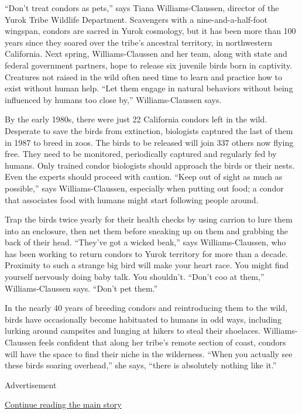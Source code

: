 ``Don't treat condors as pets,'' says Tiana Williams-Claussen, director
of the Yurok Tribe Wildlife Department. Scavengers with a
nine-and-a-half-foot wingspan, condors are sacred in Yurok cosmology,
but it has been more than 100 years since they soared over the tribe's
ancestral territory, in northwestern California. Next spring,
Williams-Claussen and her team, along with state and federal government
partners, hope to release six juvenile birds born in captivity.
Creatures not raised in the wild often need time to learn and practice
how to exist without human help. ``Let them engage in natural behaviors
without being influenced by humans too close by,'' Williams-Claussen
says.

By the early 1980s, there were just 22 California condors left in the
wild. Desperate to save the birds from extinction, biologists captured
the last of them in 1987 to breed in zoos. The birds to be released will
join 337 others now flying free. They need to be monitored, periodically
captured and regularly fed by humans. Only trained condor biologists
should approach the birds or their nests. Even the experts should
proceed with caution. ``Keep out of sight as much as possible,'' says
Williams-Claussen, especially when putting out food; a condor that
associates food with humans might start following people around.

Trap the birds twice yearly for their health checks by using carrion to
lure them into an enclosure, then net them before sneaking up on them
and grabbing the back of their head. ``They've got a wicked beak,'' says
Williams-Claussen, who has been working to return condors to Yurok
territory for more than a decade. Proximity to such a strange big bird
will make your heart race. You might find yourself nervously doing baby
talk. You shouldn't. ``Don't coo at them,'' Williams-Claussen says.
``Don't pet them.''

In the nearly 40 years of breeding condors and reintroducing them to the
wild, birds have occasionally become habituated to humans in odd ways,
including lurking around campsites and lunging at hikers to steal their
shoelaces. Williams-Claussen feels confident that along her tribe's
remote section of coast, condors will have the space to find their niche
in the wilderness. ``When you actually see these birds soaring
overhead,'' she says, ``there is absolutely nothing like it.''

Advertisement

\protect\hyperlink{after-bottom}{Continue reading the main story}

